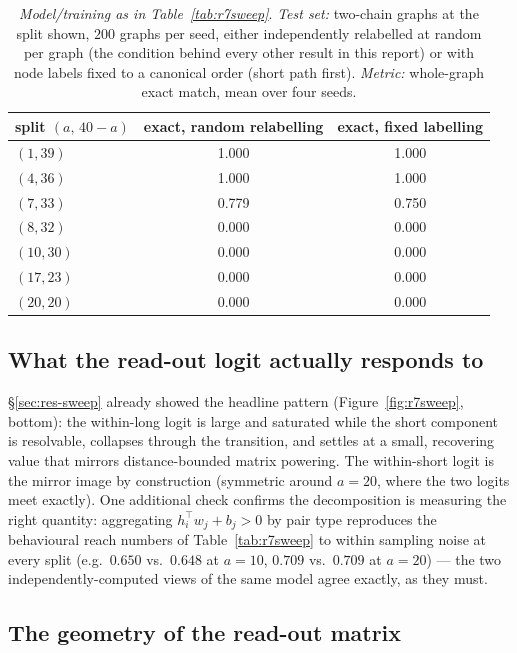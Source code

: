 \documentclass[11pt,a4paper]{article}
\begin{document}
\begin{table}[H]\centering\small
\begin{tabular}{lcc}
\toprule
split $(a,\,40{-}a)$ & exact, random relabelling & exact, fixed labelling\\
\midrule
$(1,39)$  & 1.000 & 1.000\\
$(4,36)$  & 1.000 & 1.000\\
$(7,33)$  & 0.779 & 0.750\\
$(8,32)$  & 0.000 & 0.000\\
$(10,30)$ & 0.000 & 0.000\\
$(17,23)$ & 0.000 & 0.000\\
$(20,20)$ & 0.000 & 0.000\\
\bottomrule\end{tabular}
\caption{\emph{Model/training as in Table~\ref{tab:r7sweep}}. \emph{Test set:}
two-chain graphs at the split shown, $200$ graphs per seed, either
independently relabelled at random per graph (the condition behind every other
result in this report) or with node labels fixed to a canonical order (short
path first). \emph{Metric:} whole-graph exact match, mean over four seeds.}
\label{tab:r7relabel}
\end{table}

\subsection{What the read-out logit actually responds to}
\label{sec:res-readout}

\S\ref{sec:res-sweep} already showed the headline pattern (Figure~\ref{fig:r7sweep},
bottom): the within-long logit is large and saturated while the short
component is resolvable, collapses through the transition, and settles at a
small, recovering value that mirrors distance-bounded matrix powering. The
within-short logit is the mirror image by construction (symmetric around
$a=20$, where the two logits meet exactly). One additional check confirms the
decomposition is measuring the right quantity: aggregating $h_i^\top w_j+b_j>0$
by pair type reproduces the behavioural reach numbers of Table~\ref{tab:r7sweep}
to within sampling noise at every split (e.g.\ $0.650$ vs.\ $0.648$ at $a=10$,
$0.709$ vs.\ $0.709$ at $a=20$) --- the two independently-computed views of the
same model agree exactly, as they must.

\subsection{The geometry of the read-out matrix}
\label{sec:res-wout}
\end{document}
